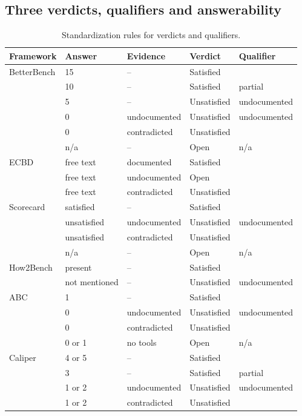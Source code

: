 \documentclass[10pt,conference]{IEEEtran}
\begin{document}
\subsection{Three verdicts, qualifiers and answerability}
\label{sec:verdicts}
\begin{table}[t]
\caption{Standardization rules for verdicts and qualifiers.}
\label{tab:standardization}
\centering\scriptsize
\setlength{\tabcolsep}{3pt}
\begin{tabular}{@{}lllll@{}}
\toprule
\textbf{Framework} & \textbf{Answer} & \textbf{Evidence} & \textbf{Verdict} & \textbf{Qualifier} \\
\midrule
BetterBench & 15 & -- & Satisfied &  \\
 & 10 & -- & Satisfied & partial \\
 & 5 & -- & Unsatisfied & undocumented \\
 & 0 & undocumented & Unsatisfied & undocumented \\
 & 0 & contradicted & Unsatisfied &  \\
 & n/a & -- & Open & n/a \\
\midrule
ECBD & free text & documented & Satisfied &  \\
 & free text & undocumented & Open &  \\
 & free text & contradicted & Unsatisfied &  \\
\midrule
Scorecard & satisfied & -- & Satisfied &  \\
 & unsatisfied & undocumented & Unsatisfied & undocumented \\
 & unsatisfied & contradicted & Unsatisfied &  \\
 & n/a & -- & Open & n/a \\
\midrule
How2Bench & present & -- & Satisfied &  \\
 & not mentioned & -- & Unsatisfied & undocumented \\
\midrule
ABC & 1 & -- & Satisfied &  \\
 & 0 & undocumented & Unsatisfied & undocumented \\
 & 0 & contradicted & Unsatisfied &  \\
 & 0 or 1 & no tools & Open & n/a \\
\midrule
Caliper & 4 or 5 & -- & Satisfied &  \\
 & 3 & -- & Satisfied & partial \\
 & 1 or 2 & undocumented & Unsatisfied & undocumented \\
 & 1 or 2 & contradicted & Unsatisfied &  \\

\end{tabular}
\end{table}
\end{document}
